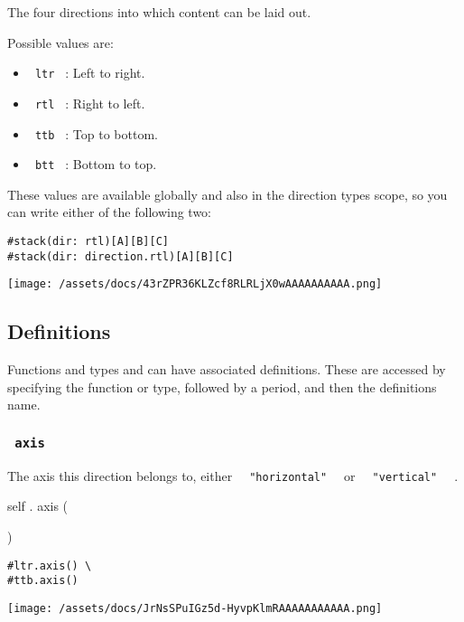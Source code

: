 The four directions into which content can be laid out.

Possible values are:

\begin{itemize}
\tightlist
\item
  \texttt{\ ltr\ } : Left to right.
\item
  \texttt{\ rtl\ } : Right to left.
\item
  \texttt{\ ttb\ } : Top to bottom.
\item
  \texttt{\ btt\ } : Bottom to top.
\end{itemize}

These values are available globally and also in the direction
type\textquotesingle s scope, so you can write either of the following
two:

\begin{verbatim}
#stack(dir: rtl)[A][B][C]
#stack(dir: direction.rtl)[A][B][C]
\end{verbatim}

\texttt{[image: /assets/docs/43rZPR36KLZcf8RLRLjX0wAAAAAAAAAA.png]}

\subsection{\texorpdfstring{{ Definitions
}}{ Definitions }}\label{definitions}

\label{definitions-tooltip}
Functions and types and can have associated definitions. These are
accessed by specifying the function or type, followed by a period, and
then the definition\textquotesingle s name.

\subsubsection{\texorpdfstring{\texttt{\ axis\ }}{ axis }}\label{definitions-axis}

The axis this direction belongs to, either
\texttt{\ }{\texttt{\ "horizontal"\ }}\texttt{\ } or
\texttt{\ }{\texttt{\ "vertical"\ }}\texttt{\ } .

self { . } { axis } (

)

\begin{verbatim}
#ltr.axis() \
#ttb.axis()
\end{verbatim}

\texttt{[image: /assets/docs/JrNsSPuIGz5d-HyvpKlmRAAAAAAAAAAA.png]}

